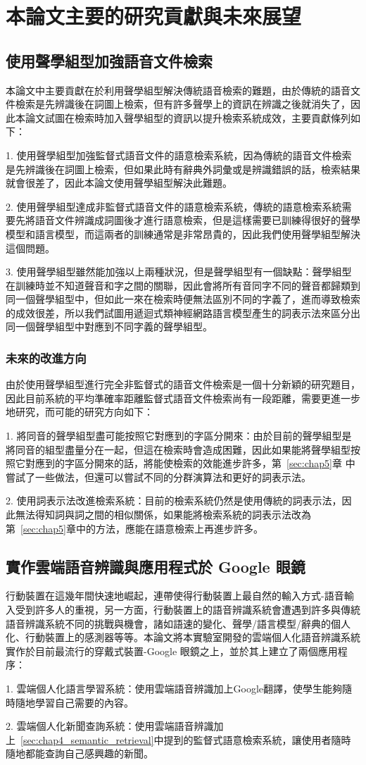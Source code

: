 \section{本論文主要的研究貢獻與未來展望}
\subsection{使用聲學組型加強語音文件檢索}
本論文中主要貢獻在於利用聲學組型解決傳統語音檢索的難題，由於傳統的語音文件檢索是先辨識後在詞圖上檢索，但有許多聲學上的資訊在辨識之後就消失了，因此本論文試圖在檢索時加入聲學組型的資訊以提升檢索系統成效，主要貢獻條列如下：

1. 使用聲學組型加強監督式語音文件的語意檢索系統，因為傳統的語音文件檢索是先辨識後在詞圖上檢索，但如果此時有辭典外詞彙或是辨識錯誤的話，檢索結果就會很差了，因此本論文使用聲學組型解決此難題。

2. 使用聲學組型達成非監督式語音文件的語意檢索系統，傳統的語意檢索系統需要先將語音文件辨識成詞圖後才進行語意檢索，但是這樣需要已訓練得很好的聲學模型和語言模型，而這兩者的訓練通常是非常昂貴的，因此我們使用聲學組型解決這個問題。

3. 使用聲學組型雖然能加強以上兩種狀況，但是聲學組型有一個缺點：聲學組型在訓練時並不知道聲音和字之間的關聯，因此會將所有音同字不同的聲音都歸類到同一個聲學組型中，但如此一來在檢索時便無法區別不同的字義了，進而導致檢索的成效很差，所以我們試圖用遞迴式類神經網路語言模型產生的詞表示法來區分出同一個聲學組型中對應到不同字義的聲學組型。

\subsubsection{未來的改進方向}
由於使用聲學組型進行完全非監督式的語音文件檢索是一個十分新穎的研究題目，因此目前系統的平均準確率距離監督式語音文件檢索尚有一段距離，需要更進一步地研究，而可能的研究方向如下：

1. 將同音的聲學組型盡可能按照它對應到的字區分開來：由於目前的聲學組型是將同音的組型盡量分在一起，但這在檢索時會造成困難，因此如果能將聲學組型按照它對應到的字區分開來的話，將能使檢索的效能進步許多，第~\ref{sec:chap5}章 中嘗試了一些做法，但還可以嘗試不同的分群演算法和更好的詞表示法。

2. 使用詞表示法改進檢索系統：目前的檢索系統仍然是使用傳統的詞表示法，因此無法得知詞與詞之間的相似關係，如果能將檢索系統的詞表示法改為 第~\ref{sec:chap5}章中的方法，應能在語意檢索上再進步許多。

\subsection{實作雲端語音辨識與應用程式於 Google 眼鏡}
行動裝置在這幾年間快速地崛起，連帶使得行動裝置上最自然的輸入方式-語音輸入受到許多人的重視，另一方面，行動裝置上的語音辨識系統會遭遇到許多與傳統語音辨識系統不同的挑戰與機會，諸如語速的變化、聲學/語言模型/辭典的個人化、行動裝置上的感測器等等。本論文將本實驗室開發的雲端個人化語音辨識系統實作於目前最流行的穿戴式裝置-Google 眼鏡之上，並於其上建立了兩個應用程序：

1. 雲端個人化語言學習系統：使用雲端語音辨識加上Google翻譯，使學生能夠隨時隨地學習自己需要的內容。

2. 雲端個人化新聞查詢系統：使用雲端語音辨識加上~\ref{sec:chap4_semantic_retrieval}中提到的監督式語意檢索系統，讓使用者隨時隨地都能查詢自己感興趣的新聞。
